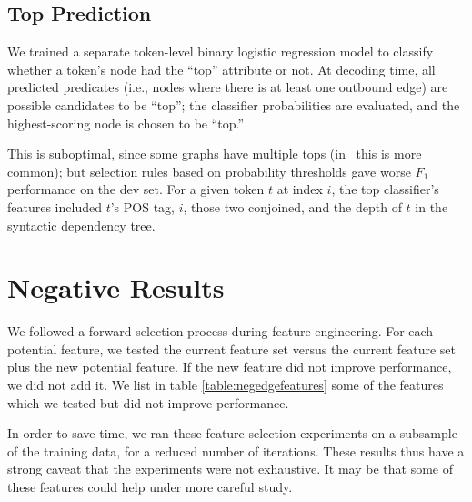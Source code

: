 \documentclass[11pt]{article}
\newcommand{\bocomment}[1]{\textcolor{Bittersweet}{[#1 -BTO]}}
\newcommand{\jmf}[1]{\textcolor{orange}{[#1 -JMF]}}
\renewcommand{\bocomment}[1]{}
\renewcommand{\jmf}[1]{}
\newcommand{\codenote}[1]{}
\begin{document}
\subsection{Top Prediction} \label{s:top_model}

\bocomment{may15 afternoon: The below describes how top pred works in LogitEdge.  Jeff, please confirm this is how you use the topness classifier, or modify appropriately.}\jmf{yes, this is correct for the graph parser}

We trained a separate token-level binary logistic regression model to classify
whether a token's node had the ``top'' attribute or not.
At decoding time, all predicted predicates (i.e., nodes where there is at least one outbound edge)
are possible candidates to be ``top'';
the classifier probabilities are evaluated, and the highest-scoring node is
chosen to be ``top.''
\codenote{LogitEdge: MyGraph::decideTops()}
This is suboptimal, since some graphs have multiple tops (in \PCEDT\ this is
more common);
but selection rules based on probability thresholds gave worse $F_1$
performance on the dev set. \codenote{\url{https://github.com/Noahs-ARK/semeval-2014/issues/37}}
For a given token $t$ at index $i$, the top classifier's features
included $t$'s POS tag, $i$, those two conjoined, and the depth
of $t$ in the syntactic dependency tree.


\section{Negative Results}
\label{s:badfeatures}

We followed a forward-selection process during feature engineering.
For each potential feature, we tested the current feature set versus the current
feature set plus the new potential feature.
If the new feature did not improve performance, we did not add it.
We list in table \ref{table:negedgefeatures} some of the features which we tested but did not improve
performance.

In order to save time, we ran these feature selection experiments
on a subsample of the training data, for a reduced number of iterations.
These results thus have a 
 strong caveat that the experiments were
not exhaustive.  It may be that some of these features could help under more careful study.
\end{document}
